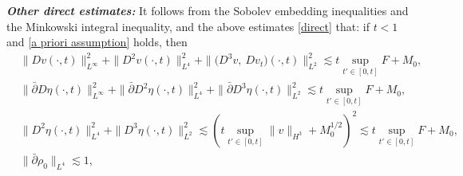 \documentclass[12pt,a4paper]{amsart}
\numberwithin{equation}{section}
\theoremstyle{plain}
\theoremstyle{definition}
\newcommand{\bpartial}{\bar{\partial}}
\begin{document}
\textsl{\textbf{Other direct estimates:}}
It follows from the Sobolev embedding inequalities and
the Minkowski integral inequality,  
and the above estimates \eqref{direct} that: 
if $t<1$ and \eqref{a priori assumption} holds, then
\begin{align*}
&\|Dv(\cdot,t)\|_{L^{\infty}}^2+\| D^2 v(\cdot,t)\|_{L^4}^2+\|\Big(D^3 v,\ Dv_t\Big)(\cdot,t)\|_{L^2}^2\lesssim t \sup\limits_{t'\in[0,t]}F+M_0,\\
&\|\bpartial D\eta(\cdot,t)\|_{L^{\infty}}^2+\|\bpartial D^2 \eta(\cdot,t)\|_{L^4}^2+\| \bpartial D^3 \eta(\cdot,t)\|_{L^2}^2 \lesssim t \sup\limits_{t'\in[0,t]}F+M_0,\\
&\| D^2 \eta(\cdot,t)\|_{L^4}^2+\|  D^3 \eta(\cdot,t)\|_{L^2}^2 \lesssim 
( t\sup\limits_{t'\in[0,t]}\|v\|_{H^3}+M_0^{1/2})^2\lesssim t  \sup\limits_{t'\in[0,t]}F+M_0,\\
&\|\bpartial \rho_0\|_{L^4}\lesssim 1,
\end{align*}
\end{document}
